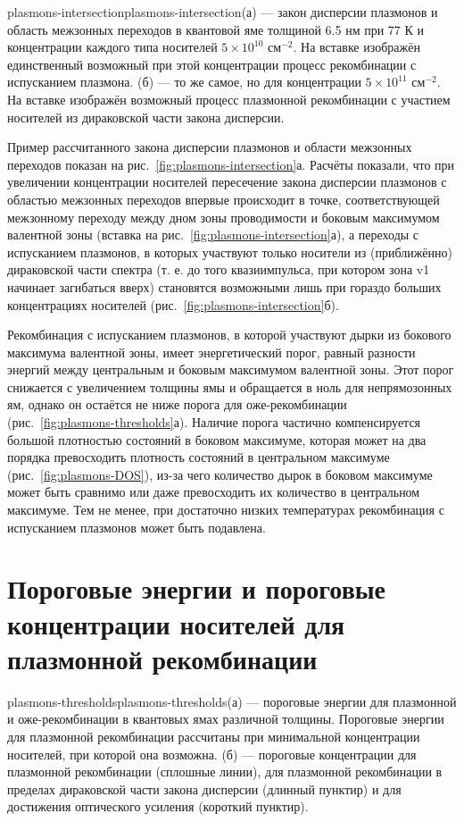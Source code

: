 \begin{fig}{plasmons-intersection}{plasmons-intersection}(а) --- закон дисперсии плазмонов и область межзонных переходов в квантовой яме \HgCdTe{} толщиной 6.5 нм при 77 К и концентрации каждого типа носителей $5\times10^{10}$ см$^{-2}$. На вставке изображён единственный возможный при этой концентрации процесс рекомбинации с испусканием плазмона. (б) --- то же самое, но для концентрации $5\times10^{11}$ см$^{-2}$. На вставке изображён возможный процесс плазмонной рекомбинации с участием носителей из дираковской части закона дисперсии.
\end{fig}

Пример рассчитанного закона дисперсии плазмонов и области межзонных переходов показан на рис.~\ref{fig:plasmons-intersection}а. Расчёты показали, что при увеличении концентрации носителей пересечение закона дисперсии плазмонов с областью межзонных переходов впервые происходит в точке, соответствующей межзонному переходу между дном зоны проводимости и боковым максимумом валентной зоны (вставка на рис.~\ref{fig:plasmons-intersection}а), а переходы с испусканием плазмонов, в которых участвуют только носители из (приближённо) дираковской части спектра (т. е. до того квазиимпульса, при котором зона v1 начинает загибаться вверх) становятся возможными лишь при гораздо больших концентрациях носителей (рис.~\ref{fig:plasmons-intersection}б).

Рекомбинация с испусканием плазмонов, в которой участвуют дырки из бокового максимума валентной зоны, имеет энергетический порог, равный разности энергий между центральным и боковым максимумом валентной зоны. Этот порог снижается с увеличением толщины ямы и обращается в ноль для непрямозонных ям, однако он остаётся не ниже порога для оже-рекомбинации (рис.~\ref{fig:plasmons-thresholds}а). Наличие порога частично компенсируется большой плотностью состояний в боковом максимуме, которая может на два порядка превосходить плотность состояний в центральном максимуме (рис.~\ref{fig:plasmons-DOS}), из-за чего количество дырок в боковом максимуме может быть сравнимо или даже превосходить их количество в центральном максимуме. Тем не менее, при достаточно низких температурах рекомбинация с испусканием плазмонов может быть подавлена.

\section{Пороговые энергии и пороговые концентрации носителей для плазмонной рекомбинации} \label{sec:plasmon-thresholds}
\begin{fig}{plasmons-thresholds}{plasmons-thresholds}(а) --- пороговые энергии для плазмонной и оже-рекомбинации в квантовых ямах \HgCdTe{} различной толщины. Пороговые энергии для плазмонной рекомбинации рассчитаны при минимальной концентрации носителей, при которой она возможна. (б) --- пороговые концентрации для плазмонной рекомбинации (сплошные линии), для плазмонной рекомбинации в пределах дираковской части закона дисперсии (длинный пунктир) и для достижения оптического усиления (короткий пунктир).
\end{fig}

